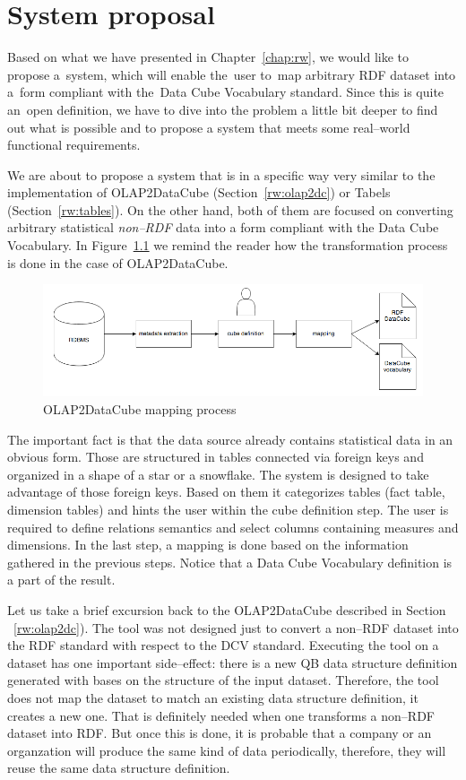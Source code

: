 \chapter{System proposal}
\label{ch:proposal}
Based on what we have presented in Chapter~\ref{chap:rw}, we would like to~
propose a~system, which will enable the~user to~map arbitrary RDF dataset
into a~form compliant with the~Data Cube Vocabulary standard. Since this is 
quite an~open definition, we have to dive into the problem a little bit deeper to 
find out what is possible and to propose a system that meets some real--world 
functional requirements.

We are about to propose a system that is in a specific way very similar to 
the implementation of OLAP2DataCube (Section~\ref{rw:olap2dc}) or Tabels (Section~\ref{rw:tables}).
On the other hand, both of them are 
focused on converting arbitrary statistical \emph{non--RDF} data into a form 
compliant with the Data Cube Vocabulary. In Figure~\ref{fig:olap2dc-mapping} we remind
the reader how the transformation process is done in the case of OLAP2DataCube.

\begin{figure}
	\centering
	\includegraphics[width=140mm]{img/mapping-olap2dc.png}
	\caption{OLAP2DataCube mapping process}
	\label{fig:olap2dc-mapping}
\end{figure}

The important fact is that the data source already contains statistical data in an obvious form. 
Those are structured in tables connected via foreign keys and organized in a 
shape of a star or a snowflake. The system is designed to take advantage of those 
foreign keys. Based on them it categorizes tables (fact table, dimension tables) and hints
the user within the cube definition step.
The user is required to define relations semantics and select columns 
containing measures and dimensions. In the last step, a 
mapping is done based on the information gathered in the previous steps.
Notice that a Data Cube Vocabulary definition is a part of the result.

Let us take a brief excursion back to the OLAP2DataCube described in Section 
~\ref{rw:olap2dc}). The tool was not designed just to convert a non--RDF dataset 
into the RDF standard with respect to the DCV standard. Executing the tool on a 
dataset has one important side--effect: there is a new QB data structure definition
generated with bases on 
the structure of the input dataset. Therefore, the tool does not map the 
dataset to match an existing data structure definition, it creates a new one. That is definitely
needed when one transforms a non--RDF dataset into RDF. But once 
this is done, it is probable that a company or an organzation will produce the 
same kind of data periodically, therefore, they will reuse the same data structure definition.

